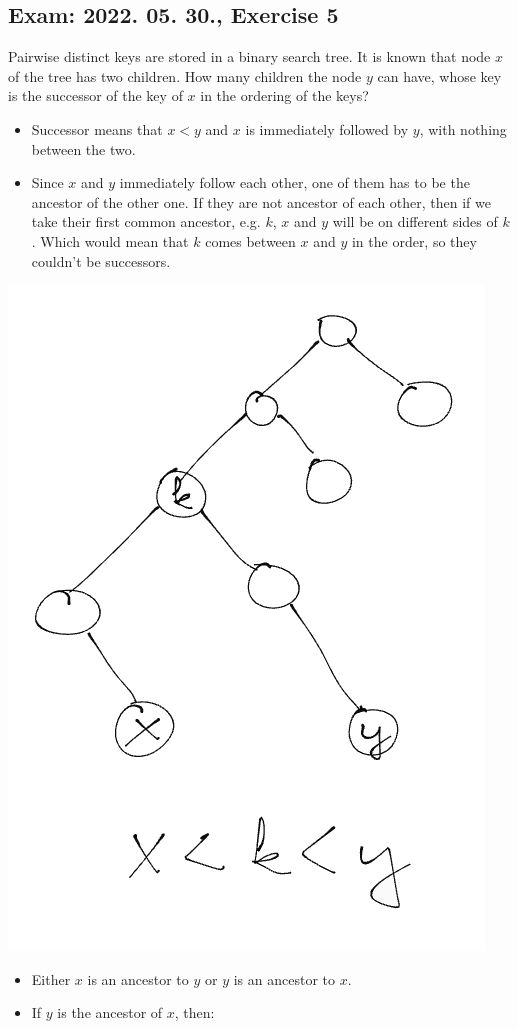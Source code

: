 \subsection{Exam: 2022. 05. 30., Exercise 5}


Pairwise distinct keys are stored in a binary search tree. It is known that
node $x$ of the tree has two children. How many children the node $y$ can have,
whose key is the successor of the key of $x$ in the ordering of the keys?


\begin{itemize}
    \item Successor means that $x<y$ and $x$ is immediately followed by $y$, with nothing between the two.
    \item Since $x$ and $y$ immediately follow each other, one of them has to be the ancestor of the other one. If they are not ancestor of each other, then if we take their first common ancestor, e.g. $k$, $x$ and $y$ will be on different sides of $k$. Which would mean that $k$ comes between $x$ and $y$ in the order, so they couldn't be successors.
\end{itemize}

\begin{center}
\includegraphics[width=0.4\linewidth]{./exams/2022_05_30/05/common_parent.png}
\end{center}

\begin{itemize}
    \item Either $x$ is an ancestor to $y$ or $y$ is an ancestor to $x$.
    \item If $y$ is the ancestor of $x$, then:
\end{itemize}

